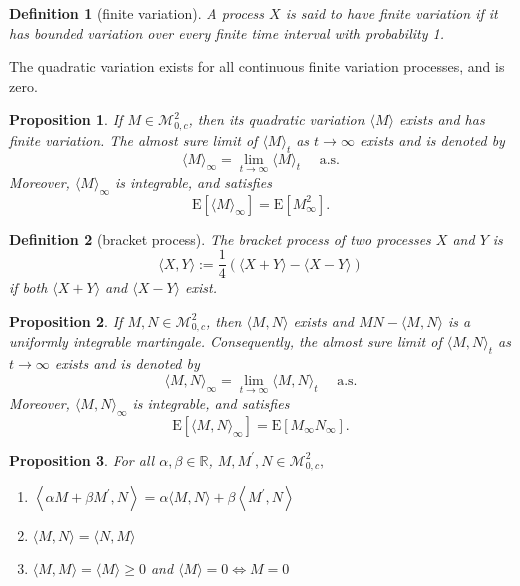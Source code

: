 \documentclass{report}
\newtheorem{definition}{Definition}[section]
\newtheorem{proposition}{Proposition}[section]
\theoremstyle{nonumberplain}
\begin{document}
\begin{definition}[finite variation]	
	A process $X$ is said to have \emph{finite variation} if it has bounded variation over every finite time interval with probability 1.	
\end{definition}	

The quadratic variation exists for all continuous finite variation processes, and is zero.
 
\begin{proposition}
	If $M\in \mathscr{M}^2_{0,c}$, then its quadratic variation $\langle M\rangle$ exists and has finite variation. The almost sure limit of $\langle M\rangle_{t}$ as $t \rightarrow \infty$ exists and is denoted by
	\[
	\langle M\rangle_{\infty}=\lim_{t\to\infty}\langle M\rangle_{t}\quad\text{ a.s.}
	\]
	Moreover, $\langle M\rangle_{\infty}$ is integrable, and satisfies
	\[
	\mathrm{E}\left[\langle M\rangle_{\infty}\right]=\mathrm{E}\left[M_{\infty}^2\right].
	\]
\end{proposition}

\begin{definition}[bracket process]	
	The bracket process of two processes $X$ and $Y$ is
	\[
	\langle X, Y\rangle:=\frac{1}{4}\left(\langle X+Y\rangle-\langle X-Y\rangle\right)
	\] 
	if both $\langle X+Y\rangle$ and $\langle X-Y\rangle$ exist.
\end{definition}

\begin{proposition}
	If $M,N\in\mathscr{M}^2_{0,c}$, then $\langle M, N\rangle$ exists and $MN-\langle M, N\rangle$ is a uniformly integrable martingale. Consequently, the almost sure limit of $\langle M, N\rangle_{t}$ as $t \rightarrow \infty$ exists and is denoted by
	\[
	\langle M, N\rangle_{\infty}=\lim_{t\to\infty}\langle M, N\rangle_{t}\quad\text{ a.s.}
	\]
	Moreover, $\langle M, N\rangle_{\infty}$ is integrable, and satisfies
	\[
	\mathrm{E}\left[\langle M, N\rangle_{\infty}\right]=\mathrm{E}\left[M_{\infty} N_{\infty}\right].
	\]
\end{proposition}

\begin{proposition}
For all $\alpha, \beta \in \mathbb{R}$, $M, M^{\prime}, N \in \mathscr{M}^2_{0,c},$

\begin{enumerate}
	\item $\left\langle\alpha M+\beta M^{\prime}, N\right\rangle=\alpha\langle M, N\rangle+\beta\left\langle M^{\prime}, N\right\rangle$
	\item$\langle M, N\rangle=\langle N, M\rangle$
	\item$\langle M, M\rangle=\langle M\rangle \geq 0$ and $\langle M\rangle= 0 \iff M=0$
\end{enumerate}
\end{proposition}
\end{document}
